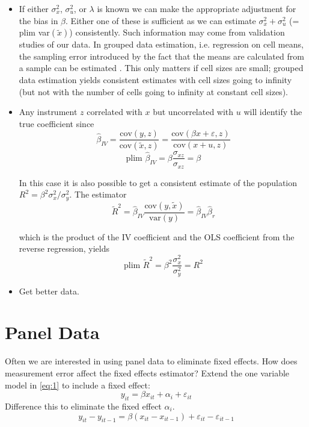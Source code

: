 \documentclass[12pt]{article}
\begin{document}
\begin{itemize}
\item If either $\sigma_x^2$, $\sigma_u^2$, or $\lambda$ is known we can make the appropriate adjustment for the bias in $\beta$. Either one of these is sufficient as we can estimate $\sigma_x^2 + \sigma_u^2$ (= plim var$(\tilde{x})$) consistently. Such information may come from validation studies of our data. In grouped data estimation, i.e. regression on cell means, the sampling error introduced by the fact that the means are calculated from a sample can be estimated \cite{Deaton_1985}. This only matters if cell sizes are small; grouped data estimation yields consistent estimates with cell sizes going to infinity (but not with the number of cells going to infinity at constant cell sizes).

\item Any instrument $z$ correlated with $x$ but uncorrelated with $u$ will identify the true coefficient since
\[
\hat{\beta}_{IV} = \frac{\text{cov}(y, z)}{\text{cov}(\tilde{x}, z)} = \frac{\text{cov}(\beta x + \varepsilon, z)}{\text{cov}(x + u, z)}
\]
\[
\text{plim } \hat{\beta}_{IV} = \beta \frac{\sigma_{xz}}{\sigma_{xz}} = \beta
\]

In this case it is also possible to get a consistent estimate of the population $R^2 = \beta^2 \sigma_x^2/\sigma_y^2$. The estimator
\[
\widetilde{R}^2 = \hat{\beta}_{IV} \frac{\text{cov}(y, \tilde{x})}{\text{var}(y)} = \hat{\beta}_{IV} \hat{\beta}_r
\]

which is the product of the IV coefficient and the OLS coefficient from the reverse regression, yields
\[
\text{plim } \widetilde{R}^2 = \beta^2 \frac{\sigma_x^2}{\sigma_y^2} = R^2
\]
\item Get better data.
\end{itemize}
\section*{Panel Data}
Often we are interested in using panel data to eliminate fixed effects. How does measurement error affect the fixed effects estimator? Extend the one variable model in \eqref{eq:1} to include a fixed effect:
\begin{equation}
\label{eq:9}
y_{it} = \beta x_{it} + \alpha_i + \varepsilon_{it}
\end{equation}
Difference this to eliminate the fixed effect $\alpha_i$.
\[
y_{it} - y_{it-1} = \beta(x_{it} - x_{it-1}) + \varepsilon_{it} - \varepsilon_{it-1}
\]
\end{document}
